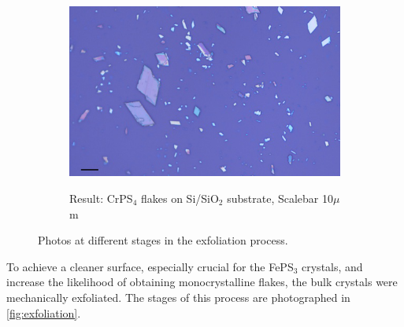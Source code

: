 \documentclass[
	twoside,
	parskip=half,
	a4paper,
]{scrbook}
\begin{document}
\begin{figure}[h]
\begin{subfigure}[t]{.3\textwidth}
		\label{fig:exfoliation_transfer}
	\end{subfigure}
	\begin{subfigure}[t]{.3\textwidth}
		\vskip 0pt
		\includegraphics[width=\textwidth]{../../data/2023-12-04_LO_MG_NiPS3/CrPS4_50x_10um.png}\\
		\caption{Result: CrPS$_\text{4}$ flakes on Si/SiO$_\text{2}$ substrate, Scalebar 10$\mu$m}
		\label{fig:exfoliation_result}
	\end{subfigure}
	\caption{Photos at different stages in the exfoliation process.}
	\label{fig:exfoliation}
\end{figure}
To achieve a cleaner surface, especially crucial for the FePS$_3$ crystals, and increase the likelihood of obtaining monocrystalline flakes, the bulk crystals were mechanically exfoliated.
The stages of this process are photographed in \autoref{fig:exfoliation}.
\end{document}
